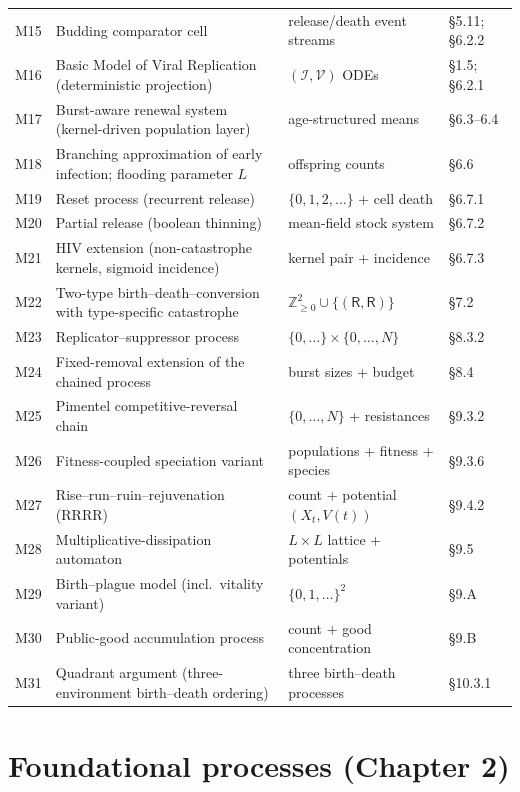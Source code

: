 \documentclass[11pt,a4paper]{report}
\newcommand{\R}{\mathsf{R}}
\newcommand{\Icell}{\mathcal{I}}
\newcommand{\Vfree}{\mathcal{V}}
\newcommand{\Xt}{X_t}
\theoremstyle{definition}
\begin{document}
{\begin{longtable}{@{}p{}p{}p{}p{}@{}}
M15 & Budding comparator cell & release/death event streams & \S5.11; \S6.2.2 \\
M16 & Basic Model of Viral Replication (deterministic projection) & $(\Icell,\Vfree)$ ODEs & \S1.5; \S6.2.1 \\
M17 & Burst-aware renewal system (kernel-driven population layer) & age-structured means & \S6.3--6.4 \\
M18 & Branching approximation of early infection; flooding parameter $L$ & offspring counts & \S6.6 \\
M19 & Reset process (recurrent release) & $\{0,1,2,\ldots\}$ + cell death & \S6.7.1 \\
M20 & Partial release (boolean thinning) & mean-field stock system & \S6.7.2 \\
M21 & HIV extension (non-catastrophe kernels, sigmoid incidence) & kernel pair + incidence & \S6.7.3 \\
M22 & Two-type birth--death--conversion with type-specific catastrophe & $\mathbb{Z}_{\ge0}^2\cup\{(\R,\R)\}$ & \S7.2 \\
M23 & Replicator--suppressor process & $\{0,\ldots\}\times\{0,\ldots,N\}$ & \S8.3.2 \\
M24 & Fixed-removal extension of the chained process & burst sizes + budget & \S8.4 \\
M25 & Pimentel competitive-reversal chain & $\{0,\ldots,N\}$ + resistances & \S9.3.2 \\
M26 & Fitness-coupled speciation variant & populations + fitness + species & \S9.3.6 \\
M27 & Rise--run--ruin--rejuvenation (RRRR) & count + potential $(\Xt,V(t))$ & \S9.4.2 \\
M28 & Multiplicative-dissipation automaton & $L\times L$ lattice + potentials & \S9.5 \\
M29 & Birth--plague model (incl.\ vitality variant) & $\{0,1,\ldots\}^2$ & \S9.A \\
M30 & Public-good accumulation process & count + good concentration & \S9.B \\
M31 & Quadrant argument (three-environment birth--death ordering) & three birth--death processes & \S10.3.1 \\
\bottomrule
\end{longtable}
}

\chapter{Foundational processes (Chapter 2)}
\end{document}
